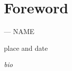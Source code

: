 \section*{Foreword}

\newline
\begin{flushright}--- NAME\end{flushright}
\begin{flushright}place and date\end{flushright}

\textit{bio}

\newpage
